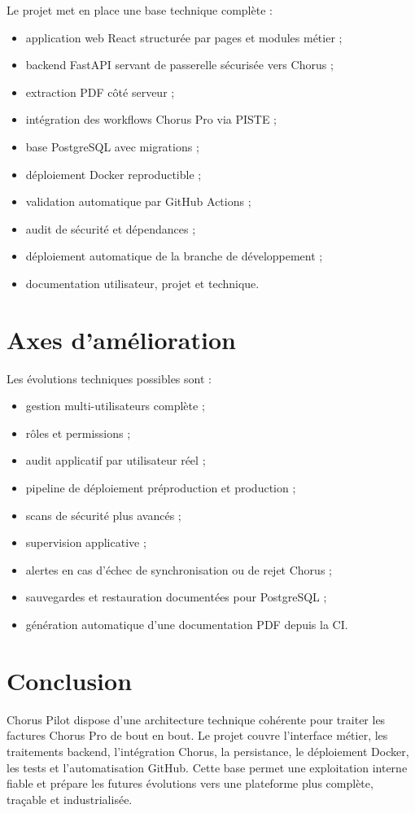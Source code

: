 \documentclass[11pt,a4paper]{article}
\begin{document}
Le projet met en place une base technique complète :

\begin{itemize}
  \item application web React structurée par pages et modules métier ;
  \item backend FastAPI servant de passerelle sécurisée vers Chorus ;
  \item extraction PDF côté serveur ;
  \item intégration des workflows Chorus Pro via PISTE ;
  \item base PostgreSQL avec migrations ;
  \item déploiement Docker reproductible ;
  \item validation automatique par GitHub Actions ;
  \item audit de sécurité et dépendances ;
  \item déploiement automatique de la branche de développement ;
  \item documentation utilisateur, projet et technique.
\end{itemize}

\section{Axes d'amélioration}

Les évolutions techniques possibles sont :

\begin{itemize}
  \item gestion multi-utilisateurs complète ;
  \item rôles et permissions ;
  \item audit applicatif par utilisateur réel ;
  \item pipeline de déploiement préproduction et production ;
  \item scans de sécurité plus avancés ;
  \item supervision applicative ;
  \item alertes en cas d'échec de synchronisation ou de rejet Chorus ;
  \item sauvegardes et restauration documentées pour PostgreSQL ;
  \item génération automatique d'une documentation PDF depuis la CI.
\end{itemize}

\section{Conclusion}

Chorus Pilot dispose d'une architecture technique cohérente pour traiter
les factures Chorus Pro de bout en bout. Le projet couvre l'interface métier, les
traitements backend, l'intégration Chorus, la persistance, le déploiement Docker,
les tests et l'automatisation GitHub. Cette base permet une exploitation interne
fiable et prépare les futures évolutions vers une plateforme plus complète,
traçable et industrialisée.
\end{document}

